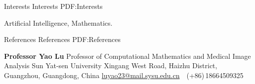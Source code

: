 \documentclass[a4paper,MMMyyyy,nonstopmode]{simpleresumecv}
\begin{document}
\begin{Body}
\BigGap
\Section
{{\large Interests}}
{{\large Interests}}
{PDF:Interests}

\Entry
Artificial Intelligence, Mathematics.


\Section
{{\large References}}
{{\large References}}
{PDF:References}


\BulletItem
\textbf{Professor Yao Lu}
\newline
Professor of Computational Mathematics and Medical Image Analysis
\newline
Sun Yat-sen University
\newline
Xingang West Road, Haizhu District, Guangzhou, Guangdong, China
\newline
\href{mailto:luyao23@mail.sysu.edu.cn}
{luyao23@mail.sysu.edu.cn}
\,\SubBulletSymbol\,
(+86)\,18664509325




\end{Body}
\end{document}

